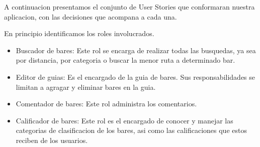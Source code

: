 A continuacion presentamos el conjunto de User Stories que conformaran nuestra aplicacion, con las decisiones que acompana a cada una.

En principio identificamos los roles involucrados.
\begin{itemize}
 \item Buscador de bares: Este rol se encarga de realizar todas las busquedas, ya sea por distancia, por categoria o buscar la menor ruta a determinado bar.
 \item Editor de guias: Es el encargado de la guia de bares. Sus responsabilidades se limitan a agragar y eliminar bares en la guia.
 \item Comentador de bares: Este rol administra los comentarios.
 \item Calificador de bares: Este rol es el encargado de conocer y manejar las categorias de clasificacion de los bares, asi como las calificaciones que estos reciben de los usuarios.
\end{itemize}